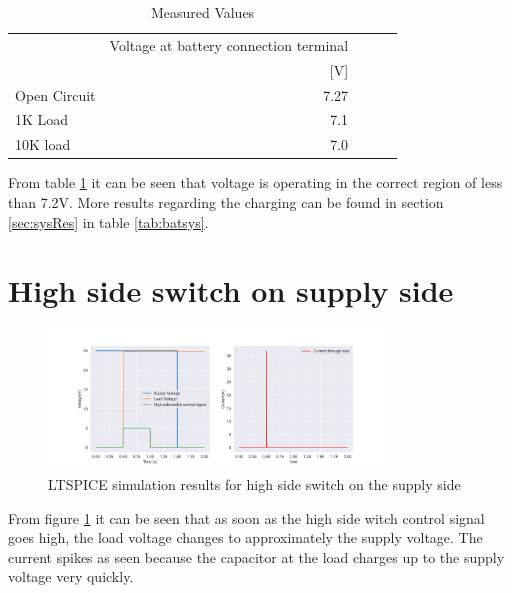 
\begin{table}[!htb]
        \centering
        \footnotesize
        \caption{Measured Values}
         \begin{tabular}{lrrrr}
          \toprule
             & Voltage at battery connection terminal \\
             &  [V] \\
          \midrule
          Open Circuit & 7.27     \\
          1K Load &  7.1     \\
          10K load &  7.0     \\

          \bottomrule
        \end{tabular}
     \label{tab:regmeas}
\end{table}
From table \ref{tab:regmeas} it can be seen that voltage is operating in the correct region of less than 7.2V. More results regarding the charging can be found in section \ref{sec:sysRes} in table \ref{tab:batsys}.



 

\newpage
\section{High side switch on supply side}

\begin{figure}[!htb]
 \footnotesize
 \centering
\includegraphics[width=0.8\textwidth]{Figures/A1.png}
\caption{LTSPICE simulation results for high side switch on the supply side}
\label{fig:high-res}
 \end{figure}
 
 From figure \ref{fig:high-res} it can be seen that as soon as the high side witch control signal goes high, the load voltage changes to approximately the supply voltage. The current spikes as seen because the capacitor at the load charges up to the supply voltage very quickly.

